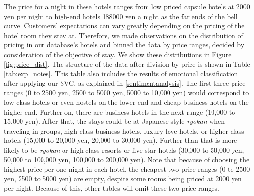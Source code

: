 \documentclass[smallextended,natbib]{svjour3}       %
\begin{document}
    The price for a night in these hotels ranges from low priced capsule hotels at 2000 yen per night to high-end hotels \num[group-separator={,}]{188000} yen a night as the far ends of the bell curve. Customers' expectations can vary greatly depending on the pricing of the hotel room they stay at. Therefore, we made observations on the distribution of pricing in our database's hotels and binned the data by price ranges, decided by consideration of the objective of stay. We show these distributions in Figure \ref{fig:price_dist}. The structure of the data after division by price is shown in Table \ref{tab:exp_notes}. This table also includes the results of emotional classification after applying our SVC, as explained in \ref{sentimentanalysis}. The first three price ranges (0 to 2500 yen, 2500 to 5000 yen, 5000 to 10,000 yen) would correspond to low-class hotels or even hostels on the lower end and cheap business hotels on the higher end. Further on, there are business hotels in the next range (10,000 to 15,000 yen). After that, the stays could be at Japanese style \textit{ryokan} when traveling in groups, high-class business hotels, luxury love hotels, or higher class hotels (15,000 to 20,000 yen, 20,000 to 30,000 yen). Further than that is more likely to be \textit{ryokan} or high class resorts or five-star hotels (30,000 to 50,000 yen, 50,000 to 100,000 yen, 100,000 to 200,000 yen). Note that because of choosing the highest price per one night in each hotel, the cheapest two price ranges (0 to 2500 yen, 2500 to 5000 yen) are empty, despite some rooms being priced at 2000 yen per night. Because of this, other tables will omit these two price ranges.
\end{document}
